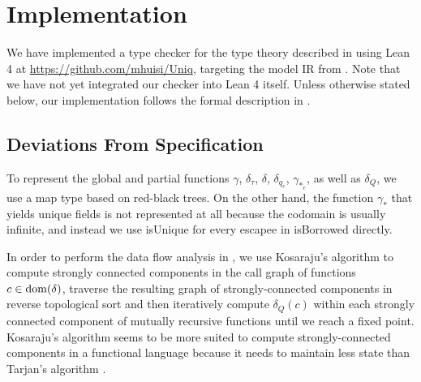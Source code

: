 \chapter{Implementation}\label{sec:implementation}

We have implemented a type checker for the type theory described in  using Lean 4 at \url{https://github.com/mhuisi/Uniq}, targeting the model IR from . Note that we have not yet integrated our checker into Lean 4 itself. Unless otherwise stated below, our implementation follows the formal description in .

\section{Deviations From Specification}

To represent the global and partial functions $\gamma$, $\delta_\tau$, $\delta$, $\delta_{q_e}$, $\gamma_{*_e}$, as well as $\delta_Q$, we use a map type based on red-black trees. On the other hand, the function $\gamma_*$ that yields unique fields is not represented at all because the codomain is usually infinite, and instead we use isUnique for every escapee in isBorrowed directly.

In order to perform the data flow analysis in , we use Kosaraju's algorithm \citep{sharir_strong-connectivity_1981} to compute strongly connected components in the call graph of functions $c \in \mathrm{dom}(\delta)$, traverse the resulting graph of strongly-connected components in reverse topological sort and then iteratively compute $\delta_Q(c)$ within each strongly connected component of mutually recursive functions until we reach a fixed point. Kosaraju's algorithm seems to be more suited to compute strongly-connected components in a functional language because it needs to maintain less state than Tarjan's algorithm \citep{tarjan_depth-first_1972}.

